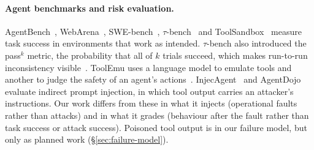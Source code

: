\paragraph{Agent benchmarks and risk evaluation.} AgentBench~\cite{liu2023agentbench}, WebArena~\cite{zhou2023webarena}, SWE-bench~\cite{jimenez2023swebench}, $\tau$-bench~\cite{yao2024taubench} and ToolSandbox~\cite{lu2024toolsandbox} measure task success in environments that work as intended. $\tau$-bench also introduced the pass$^k$ metric, the probability that all of $k$ trials succeed, which makes run-to-run inconsistency visible~\cite{yao2024taubench}. ToolEmu uses a language model to emulate tools and another to judge the safety of an agent's actions~\cite{ruan2023toolemu}. InjecAgent~\cite{zhan2024injecagent} and AgentDojo~\cite{debenedetti2024agentdojo} evaluate indirect prompt injection, in which tool output carries an attacker's instructions. Our work differs from these in what it injects (operational faults rather than attacks) and in what it grades (behaviour after the fault rather than task success or attack success). Poisoned tool output is in our failure model, but only as planned work (\S\ref{sec:failure-model}).

